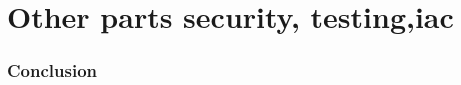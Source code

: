 \setcounter{section}{0}
\part{Other parts security, testing,iac}\label{sec:conclusion}

\section{Conclusion}

\newpage